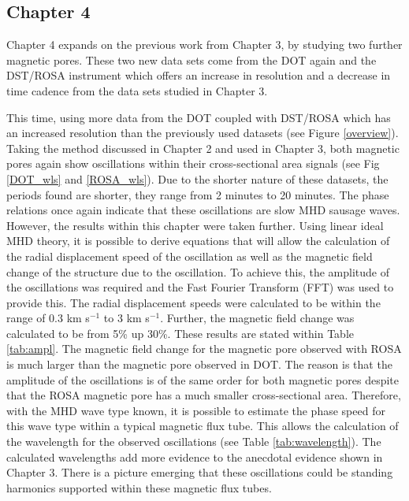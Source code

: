     \subsection{Chapter 4}
    	
    Chapter 4 expands on the previous work from Chapter 3, by studying two further magnetic pores.
    These two new data sets come from the DOT again and the DST/ROSA instrument which offers an increase in resolution and a decrease in time cadence from the data sets studied in Chapter 3.
    
    This time, using more data from the DOT coupled with DST/ROSA which has an increased resolution than the previously used datasets (see Figure \ref{overview}).
    Taking the method discussed in Chapter 2 and used in Chapter 3, both magnetic pores again show oscillations within their cross-sectional area signals (see Fig \ref{DOT_wls} and \ref{ROSA_wls}).     
    Due to the shorter nature of these datasets, the periods found are shorter, they range from 2 minutes to 20 minutes.
    The phase relations once again indicate that these oscillations are slow MHD sausage waves.
    However, the results within this chapter were taken further.
    Using linear ideal MHD theory, it is possible to derive equations that will allow the calculation of the radial displacement speed of the oscillation as well as the magnetic field change of the structure due to the oscillation.
    To achieve this, the amplitude of the oscillations was required and the Fast Fourier Transform (FFT) was used to provide this.
    The radial displacement speeds were calculated to be within the range of 0.3 km s$^{-1}$ to 3 km s$^{-1}$. 
    Further, the magnetic field change was calculated to be from 5\% up 30\%. 
    These results are stated within Table \ref{tab:ampl}.
    The magnetic field change for the magnetic pore observed with ROSA is much larger than the magnetic pore observed in DOT.
    The reason is that the amplitude of the oscillations is of the same order for both magnetic pores despite that the ROSA magnetic pore has a much smaller cross-sectional area.
    Therefore, with the MHD wave type known, it is possible to estimate the phase speed for this wave type within a typical magnetic flux tube.
    This allows the calculation of the wavelength for the observed oscillations (see Table \ref{tab:wavelength}).
    The calculated wavelengths add more evidence to the anecdotal evidence shown in Chapter 3.
    There is a picture emerging that these oscillations could be standing harmonics supported within these magnetic flux tubes. 
